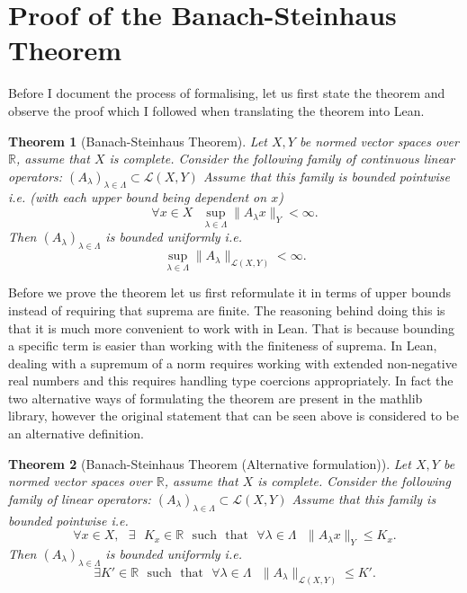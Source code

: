\documentclass[11pt]{article}
\newcommand\R{\mathbb{R}}
\newcommand\sucht{\sep \mathrm{such} \sep \mathrm{that} \sep}
\newcommand\sep{\text{ }}
\newtheorem*{theorem}{Theorem}
\begin{document}
\section*{Proof of the Banach-Steinhaus Theorem}

Before I document the process of formalising, let us first state the
theorem and observe the proof which I followed when translating the theorem
into Lean.
\begin{theorem}[Banach-Steinhaus Theorem]
  Let $X, Y$ be normed vector spaces over $\R$, assume that $X$ is complete. Consider
  the following family of continuous linear operators:
  $\left( A_\lambda \right)_{\lambda \in \Lambda} \subset \mathcal{L}\left( X, Y \right) $
  Assume that this family is bounded pointwise i.e. (with each upper bound being dependent on $x$)
  \[
    \forall x \in X \sep \sup_{\lambda \in \Lambda} \|A_\lambda x\|_Y < \infty
  .\]
  Then $\left( A_\lambda \right)_{\lambda \in \Lambda}$ is bounded uniformly i.e.
  \[
    \sup_{\lambda \in \Lambda} \|A_\lambda \|_{\mathcal{L}\left( X, Y \right) } < \infty
  .\]
\end{theorem}
Before we prove the theorem let us first reformulate it in terms of upper
bounds instead of requiring that suprema are finite. The reasoning behind doing
this is that it is much more convenient to work with in Lean. That is because
bounding a specific term is easier than working with the finiteness of suprema.
In Lean, dealing with a supremum of a norm requires working with extended non-negative
real numbers and this requires handling type coercions appropriately.
In
fact the two alternative ways of formulating the theorem are present in the
mathlib library, however the original statement that can be seen above is
considered to be an alternative definition.

\begin{theorem}[Banach-Steinhaus Theorem (Alternative formulation)]
  Let $X, Y$ be normed vector spaces over $\R$, assume that $X$ is complete. Consider
  the following family of linear operators:
  $\left( A_\lambda \right)_{\lambda \in \Lambda} \subset \mathcal{L}\left( X, Y \right) $
  Assume that this family is bounded pointwise i.e.
  \[
    \forall x \in X, \sep \exists \sep K_x \in \R \sucht \forall \lambda \in \Lambda \sep \|A_\lambda x\|_Y \le K_x
  .\]
  Then $\left( A_\lambda \right)_{\lambda \in \Lambda}$ is bounded uniformly i.e.
  \[
    \exists K' \in \R \sucht \forall \lambda \in \Lambda \sep \|A_\lambda \|_{\mathcal{L}\left( X, Y \right) } \le K'  .\]
\end{theorem}
\end{document}
